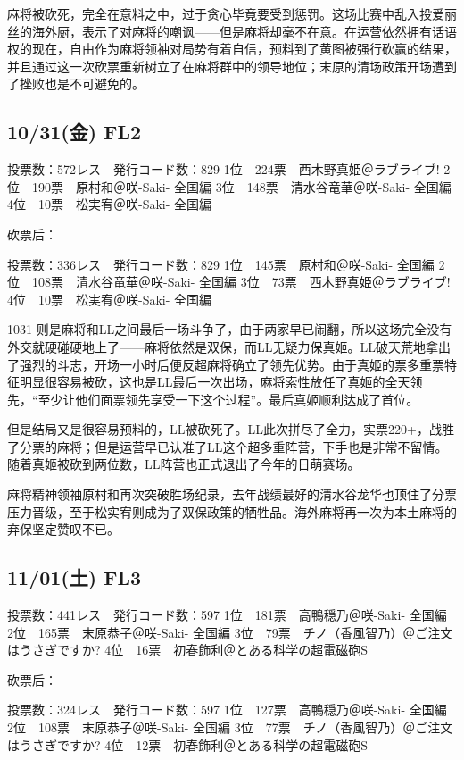 麻将被砍死，完全在意料之中，过于贪心毕竟要受到惩罚。这场比赛中乱入投爱丽丝的海外厨，表示了对麻将的嘲讽——但是麻将却毫不在意。在运营依然拥有话语权的现在，自由作为麻将领袖对局势有着自信，预料到了黄图被强行砍赢的结果，并且通过这一次砍票重新树立了在麻将群中的领导地位；末原的清场政策开场遭到了挫败也是不可避免的。

\subsection{10/31(金) FL2}

	投票数：572レス　発行コード数：829
	1位　224票　西木野真姫＠ラブライブ!
	2位　190票　原村和＠咲-Saki- 全国編
	3位　148票　清水谷竜華＠咲-Saki- 全国編
	4位　10票　松実宥＠咲-Saki- 全国編

砍票后：

	投票数：336レス　発行コード数：829
	1位　145票　原村和＠咲-Saki- 全国編
	2位　108票　清水谷竜華＠咲-Saki- 全国編
	3位　73票　西木野真姫＠ラブライブ!
	4位　10票　松実宥＠咲-Saki- 全国編

1031 则是麻将和LL之间最后一场斗争了，由于两家早已闹翻，所以这场完全没有外交就硬碰硬地上了——麻将依然是双保，而LL无疑力保真姬。LL破天荒地拿出了强烈的斗志，开场一小时后便反超麻将确立了领先优势。由于真姬的票多重票特征明显很容易被砍，这也是LL最后一次出场，麻将索性放任了真姬的全天领先，“至少让他们面票领先享受一下这个过程”。最后真姬顺利达成了首位。

但是结局又是很容易预料的，LL被砍死了。LL此次拼尽了全力，实票220+，战胜了分票的麻将；但是运营早已认准了LL这个超多重阵营，下手也是非常不留情。随着真姬被砍到两位数，LL阵营也正式退出了今年的日萌赛场。

麻将精神领袖原村和再次突破胜场纪录，去年战绩最好的清水谷龙华也顶住了分票压力晋级，至于松实宥则成为了双保政策的牺牲品。海外麻将再一次为本土麻将的弃保坚定赞叹不已。

\subsection{11/01(土) FL3}

	投票数：441レス　発行コード数：597
	1位　181票　高鴨穏乃＠咲-Saki- 全国編
	2位　165票　末原恭子＠咲-Saki- 全国編
	3位　79票　チノ（香風智乃）＠ご注文はうさぎですか?
	4位　16票　初春飾利＠とある科学の超電磁砲S

砍票后：

	投票数：324レス　発行コード数：597
	1位　127票　高鴨穏乃＠咲-Saki- 全国編
	2位　108票　末原恭子＠咲-Saki- 全国編
	3位　77票　チノ（香風智乃）＠ご注文はうさぎですか?
	4位　12票　初春飾利＠とある科学の超電磁砲S

